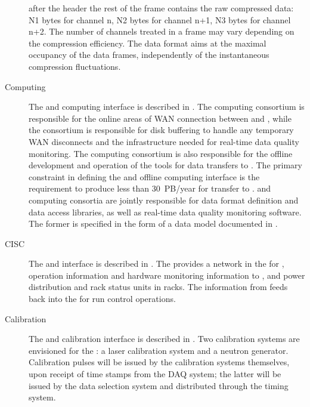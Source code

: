 \begin{description}
after the header the rest of the frame contains the raw compressed data:  N1 bytes for channel n,  N2 bytes for channel n+1, N3 bytes for channel n+2.  The number of channels treated in a frame may vary depending on the compression efficiency. The data format aims at the maximal  occupancy of the data frames, independently of the instantaneous compression fluctuations.


\item[Computing] The  and computing interface is described in
  .
  The computing consortium is responsible for the online areas of WAN connection
  between \surf and \fnal, while the  consortium is responsible for
  disk buffering to handle any temporary WAN disconnects and the infrastructure
  needed for real-time data quality monitoring. 
  The computing consortium is also responsible for the offline development and
  operation of the tools for data transfers to \fnal.
  The primary constraint in defining the  and offline computing
  interface is the requirement to produce less than \SI{30}{PB/year} for
  transfer to \fnal.
   and computing consortia are jointly responsible for data format
  definition and data access libraries, as well as real-time data quality
  monitoring software.
  The former is specified in the form of a data model documented in
  .

\item[CISC] The  and  interface is described in
  . 
  The  provides a network in the  for ,
  operation information and hardware monitoring information to , and
  power distribution and rack status units in  racks. 
  The information from  feeds back into the  for run
  control operations.

\item[Calibration] The  and calibration interface is described in
  .
 Two calibration systems are envisioned 
  for the : a laser calibration
  system and a neutron generator.
  Calibration pulses will be issued by the calibration systems themselves, upon
  receipt of time stamps from the DAQ system; %
  the latter will be issued by the data selection system and distributed through
  the  timing system.


\end{description}
